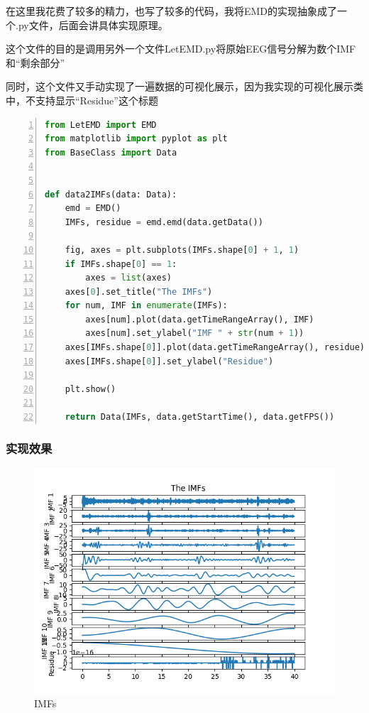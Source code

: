\documentclass[cs4size,a4paper]{ctexart}
\numberwithin{equation}{section}
\numberwithin{table}{section}
\numberwithin{figure}{section}
\begin{document}
在这里我花费了较多的精力，也写了较多的代码，我将EMD的实现抽象成了一个.py文件，后面会讲具体实现原理。

这个文件的目的是调用另外一个文件\colorbox{LetMeFlyGray}{LetEMD.py}将原始EEG信号分解为数个IMF和“剩余部分”

同时，这个文件又手动实现了一遍数据的可视化展示，因为我实现的可视化展示类中，不支持显示“Residue”这个标题

\begin{lstlisting}[language={python},
numbers=left,
numberstyle=\tiny\monaco,
basicstyle=\footnotesize\monaco]
from LetEMD import EMD
from matplotlib import pyplot as plt
from BaseClass import Data


def data2IMFs(data: Data):
    emd = EMD()
    IMFs, residue = emd.emd(data.getData())

    fig, axes = plt.subplots(IMFs.shape[0] + 1, 1)
    if IMFs.shape[0] == 1:
        axes = list(axes)
    axes[0].set_title("The IMFs")
    for num, IMF in enumerate(IMFs):
        axes[num].plot(data.getTimeRangeArray(), IMF)
        axes[num].set_ylabel("IMF " + str(num + 1))
    axes[IMFs.shape[0]].plot(data.getTimeRangeArray(), residue)
    axes[IMFs.shape[0]].set_ylabel("Residue")
    
    plt.show()

    return Data(IMFs, data.getStartTime(), data.getFPS())
\end{lstlisting}

\subsubsection{实现效果}

\begin{figure}[H]
\small
\centering
\includegraphics{IMFs.png}
\caption{IMFs} \label{fig:IMFs}
\end{figure}
\end{document}

